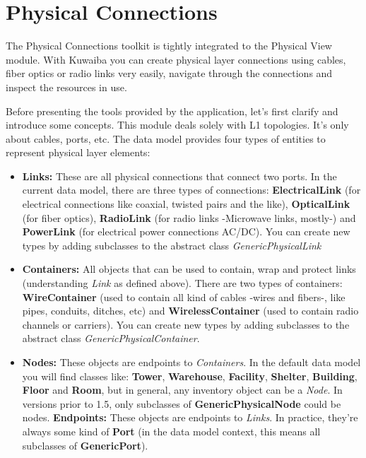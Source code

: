 \documentclass[a4paper]{article}
\begin{document}
	\clearpage
	\section{Physical Connections} \label{sec:physical_connections}
		The Physical Connections toolkit is tightly integrated to the Physical View module. With Kuwaiba you can create physical layer connections using cables, fiber optics or radio links very easily, navigate through the connections and inspect the resources in use.\newline
		
		Before presenting the tools provided by the application, let's first clarify and introduce some concepts. This module deals solely with L1 topologies. It's only about cables, ports, etc. The data model provides four types of entities to represent physical layer elements:
		\begin{itemize}
			\item \textbf{Links:} These are all physical connections that connect two ports. In the current data model, there are three	types of connections: \textbf{ElectricalLink} (for electrical connections like coaxial, twisted
			pairs and the like), \textbf{OpticalLink} (for fiber optics), \textbf{RadioLink} (for radio links -Microwave links, mostly-) and \textbf{PowerLink} (for electrical power connections AC/DC). You can create new types by adding subclasses to the abstract class \textit{GenericPhysicalLink}
			\item \textbf{Containers:} All objects that can be used to contain, wrap and protect links (understanding \textit{Link} as defined above). There are two types of containers: \textbf{WireContainer} (used to contain all kind of cables -wires and fibers-, like pipes, conduits, ditches, etc) and \textbf{WirelessContainer} (used to contain radio channels or carriers). You can create new types by adding subclasses to the abstract class \textit{GenericPhysicalContainer}.
			\item \textbf{Nodes:} These objects are endpoints to \textit{Containers}. In the default data model you will find classes like: \textbf{Tower}, \textbf{Warehouse}, \textbf{Facility}, \textbf{Shelter}, \textbf{Building}, \textbf{Floor} and \textbf{Room}, but in general, any inventory object can be a \textit{Node}. In versions prior to 1.5, only subclasses of \textbf{GenericPhysicalNode} could be nodes.
			\textbf{Endpoints:} These objects are endpoints to \textit{Links}. In practice, they're always some kind of \textbf{Port} (in the data model context, this means all subclasses of \textbf{GenericPort}).
		\end{itemize}
\end{document}
